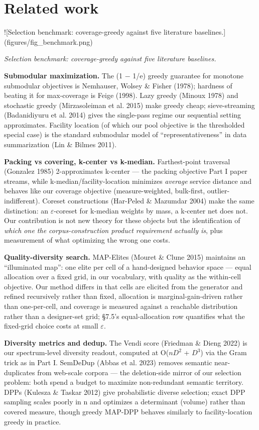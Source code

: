 \documentclass[11pt]{article}
\theoremstyle{plain}
\theoremstyle{definition}
\begin{document}
\section{Related work}
![Selection benchmark: coverage-greedy against five literature baselines.](figures/fig\_benchmark.png)

\emph{Selection benchmark: coverage-greedy against five literature baselines.}

\textbf{Submodular maximization.} The (1 $-$ 1/e) greedy guarantee for monotone submodular objectives is Nemhauser, Wolsey \& Fisher (1978); hardness of beating it for max-coverage is Feige (1998). Lazy greedy (Minoux 1978) and stochastic greedy (Mirzasoleiman et al. 2015) make greedy cheap; sieve-streaming (Badanidiyuru et al. 2014) gives the single-pass regime our sequential setting approximates. Facility location (of which our pool objective is the thresholded special case) is the standard submodular model of ``representativeness'' in data summarization (Lin \& Bilmes 2011).

\textbf{Packing vs covering, k-center vs k-median.} Farthest-point traversal (Gonzalez 1985) 2-approximates k-center --- the packing objective Part I paper streams, while k-median/facility-location minimizes \emph{average} service distance and behaves like our coverage objective (measure-weighted, bulk-first, outlier-indifferent). Coreset constructions (Har-Peled \& Mazumdar 2004) make the same distinction: an $\varepsilon$-coreset for k-median weights by mass, a k-center net does not. Our contribution is not new theory for these objects but the identification of \emph{which one the corpus-construction product requirement actually is}, plus measurement of what optimizing the wrong one costs.

\textbf{Quality-diversity search.} MAP-Elites (Mouret \& Clune 2015) maintains an ``illuminated map'': one elite per cell of a hand-designed behavior space --- equal allocation over a fixed grid, in our vocabulary, with quality as the within-cell objective. Our method differs in that cells are elicited from the generator and refined recursively rather than fixed, allocation is marginal-gain-driven rather than one-per-cell, and coverage is measured against a reachable distribution rather than a designer-set grid; \S{}7.5's equal-allocation row quantifies what the fixed-grid choice costs at small $\varepsilon$.

\textbf{Diversity metrics and dedup.} The Vendi score (Friedman \& Dieng 2022) is our spectrum-level diversity readout, computed at O($nD^{2}$ + $D^{3}$) via the Gram trick as in Part I. SemDeDup (Abbas et al. 2023) removes semantic near-duplicates from web-scale corpora --- the deletion-side mirror of our selection problem: both spend a budget to maximize non-redundant semantic territory. DPPs (Kulesza \& Taskar 2012) give probabilistic diverse selection; exact DPP sampling scales poorly in n and optimizes a determinant (volume) rather than covered measure, though greedy MAP-DPP behaves similarly to facility-location greedy in practice.
\end{document}
